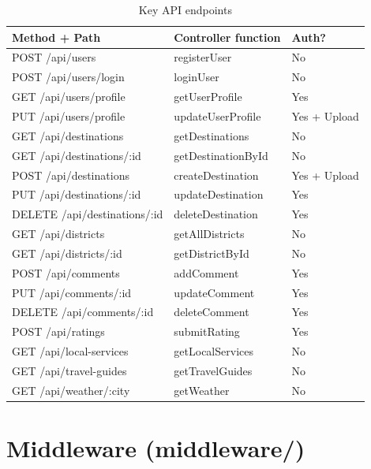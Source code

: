 \documentclass[12pt,a4paper]{report}
\begin{document}
\begin{table}[H]
  \centering
  \caption{Key API endpoints}
  \begin{tabular}{lll}
    \toprule
    \textbf{Method + Path} & \textbf{Controller function} & \textbf{Auth?} \\
    \midrule
    POST /api/users             & registerUser          & No \\
    POST /api/users/login       & loginUser             & No \\
    GET  /api/users/profile     & getUserProfile        & Yes \\
    PUT  /api/users/profile     & updateUserProfile     & Yes + Upload \\
    GET  /api/destinations      & getDestinations       & No \\
    GET  /api/destinations/:id  & getDestinationById    & No \\
    POST /api/destinations      & createDestination     & Yes + Upload \\
    PUT  /api/destinations/:id  & updateDestination     & Yes \\
    DELETE /api/destinations/:id& deleteDestination     & Yes \\
    GET  /api/districts         & getAllDistricts        & No \\
    GET  /api/districts/:id     & getDistrictById       & No \\
    POST /api/comments          & addComment            & Yes \\
    PUT  /api/comments/:id      & updateComment         & Yes \\
    DELETE /api/comments/:id    & deleteComment         & Yes \\
    POST /api/ratings           & submitRating          & Yes \\
    GET  /api/local-services    & getLocalServices      & No \\
    GET  /api/travel-guides     & getTravelGuides       & No \\
    GET  /api/weather/:city     & getWeather            & No \\
    \bottomrule
  \end{tabular}
\end{table}

\section{Middleware (middleware/)}
\end{document}
